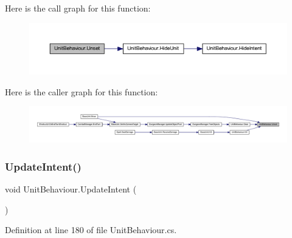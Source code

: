 Here is the call graph for this function\+:
\nopagebreak
\begin{figure}[H]
\begin{center}
\leavevmode
\includegraphics[width=350pt]{class_unit_behaviour_adf2d07785a2cc3076363ad5dd0962b9c_cgraph}
\end{center}
\end{figure}
Here is the caller graph for this function\+:
\nopagebreak
\begin{figure}[H]
\begin{center}
\leavevmode
\includegraphics[width=350pt]{class_unit_behaviour_adf2d07785a2cc3076363ad5dd0962b9c_icgraph}
\end{center}
\end{figure}
\mbox{\label{class_unit_behaviour_a38efbe995d8d2f3c522cb2fa076e79cc}} 
\subsubsection{\texorpdfstring{UpdateIntent()}{UpdateIntent()}}
{\footnotesize\ttfamily void Unit\+Behaviour.\+Update\+Intent (\begin{DoxyParamCaption}{ }\end{DoxyParamCaption})}



Definition at line 180 of file Unit\+Behaviour.\+cs.

